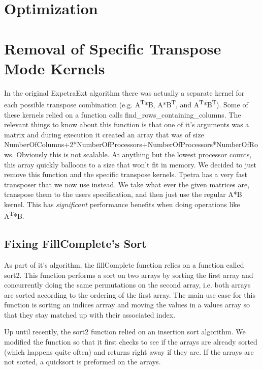 \documentclass{article}
\newcommand{\mahts}[1]{\textsuperscript{#1}}
\begin{document}
\section{Optimization}

\section{Removal of Specific Transpose Mode Kernels}
In the original ExpetraExt algorithm there was actually a separate kernel for each possible transpose combination 
(e.g. A\mahts{T}*B, A*B\mahts{T}, and A\mahts{T}*B\mahts{T}).
Some of these kernels relied on a function calls find\_rows\_containing\_columns. The relevant things to know about this 
function is that one of it's arguments was a matrix and during execution it created an array that was of size 
NumberOfColumns+2*NumberOfProcessors+NumberOfProcessors*NumberOfRows.
Obviously this is not scalable. At anything but the lowest processor counts, this array quickly balloons to a size that 
won't fit in memory. We decided to just remove this function and the specific transpose kernels. Tpetra has a very fast 
transposer that we now use instead. We take what ever the given matrices are, transpose them to the users specification, 
and then just use the regular A*B kernel. This has \emph{significant} performance benefits when doing operations like 
A\mahts{T}*B.

\subsection{Fixing FillComplete's Sort}
As part of it's algorithm, the fillComplete function relies on a function called sort2. This function performs a sort 
on two arrays by sorting the first array and concurrently doing the same permutations on the second array, 
i.e. both arrays are sorted according to the ordering of the first array. The main use case for this function is sorting 
an indices arrray and moving the values in a values array so that they stay matched up with their associated index.

Up until recently, the sort2 function relied on an insertion sort algorithm. We modified the function so that it first 
checks to see if the arrays are already sorted (which happens quite often) and returns right away if they are. 
If the arrays are not sorted, a quicksort is preformed on the arrays.
\end{document}
